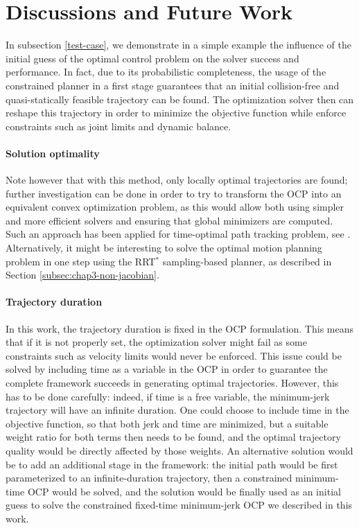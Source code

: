 \section{Discussions and Future Work}
\label{discussion}

In subsection \ref{test-case}, we demonstrate in a simple example the
influence of the initial guess of the optimal control problem on the
solver success and performance. In fact, due to its probabilistic
completeness, the usage of the constrained planner in a first stage
guarantees that an initial collision-free and quasi-statically
feasible trajectory can be found. The optimization solver then can
reshape this trajectory in order to minimize the objective function
while enforce constraints such as joint limits and dynamic
balance.

\paragraph{Solution optimality}
Note however that with this method, only locally optimal trajectories
are found; further investigation can be done in order to try to
transform the OCP into an equivalent convex optimization problem, as
this would allow both using simpler and more efficient solvers and
ensuring that global minimizers are computed. Such an approach has
been applied for time-optimal path tracking problem, see
\cite{verscheure2009time}. Alternatively, it might be interesting to
solve the optimal motion planning problem in one step using the
RRT$^*$ sampling-based planner, as described in Section
\ref{subsec:chap3-non-jacobian}.

\paragraph{Trajectory duration}
In this work, the trajectory duration is fixed in the OCP
formulation. This means that if it is not properly set, the
optimization solver might fail as some constraints such as velocity
limits would never be enforced. This issue could be solved by
including time as a variable in the OCP in order to guarantee the
complete framework succeeds in generating optimal
trajectories. However, this has to be done carefully: indeed, if time
is a free variable, the minimum-jerk trajectory will have an infinite
duration. One could choose to include time in the objective function,
so that both jerk and time are minimized, but a suitable weight ratio
for both terms then needs to be found, and the optimal trajectory
quality would be directly affected by those weights. An alternative
solution would be to add an additional stage in the framework: the
initial path would be first parameterized to an infinite-duration
trajectory, then a constrained minimum-time OCP would be solved, and
the solution would be finally used as an initial guess to solve the
constrained fixed-time minimum-jerk OCP we described in this work.

